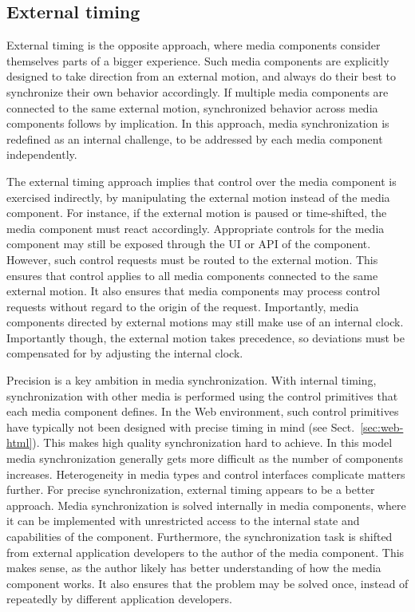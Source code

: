 \subsection {External timing}

External timing is the opposite approach, where media components consider
themselves parts of a bigger experience. Such media components are explicitly
designed to take direction from an external motion, and always do their best
to synchronize their own behavior accordingly. If multiple media components
are connected to the same external motion, synchronized behavior across media
components follows by implication. In this approach, media synchronization is
redefined as an internal challenge, to be addressed by each media component
independently.



The external timing approach implies that control over the media component is
exercised indirectly, by manipulating the external motion instead of the media
component. For instance, if the external motion is paused or time-shifted, the
media component must react accordingly. Appropriate controls for the media
component may still be exposed through the UI or API of the component.
However, such control requests must be routed to the external motion. This
ensures that control applies to all media components connected to the same
external motion. It also ensures that media components may process control
requests without regard to the origin of the request. Importantly, media
components directed by external motions may still make use of an internal
clock. Importantly though, the external motion takes precedence, so deviations
must be compensated for by adjusting the internal clock.


Precision is a key ambition in media synchronization. With internal timing,
synchronization with other media is performed using the control primitives
that each media component defines. In the Web environment, such control
primitives have typically not been designed with precise timing in mind  (see
Sect.~\ref{sec:web-html}).  This makes high quality synchronization hard to
achieve. In this model media synchronization generally gets more difficult as
the number of components increases. Heterogeneity in media types and control
interfaces complicate matters further. For precise synchronization, external
timing appears to be a better approach. Media synchronization is solved
internally in media components, where it can be implemented with unrestricted
access to the internal state and capabilities of the component. Furthermore,
the synchronization task is shifted from external application developers to
the author of the media component. This makes sense, as the author likely has
better understanding of how the media component works. It also ensures that
the problem may be solved once, instead of repeatedly by different application
developers.



